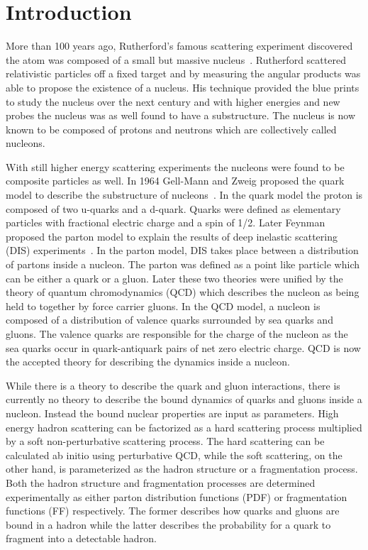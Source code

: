 \chapter{Introduction} \label{ch::intro}

More than 100 years ago, Rutherford's famous scattering experiment discovered
the atom was composed of a small but massive nucleus~\cite{Rutherford:1911zz}.
Rutherford scattered relativistic particles off a fixed target and by measuring
the angular products was able to propose the existence of a nucleus.  His
technique provided the blue prints to study the nucleus over the next century
and with higher energies and new probes the nucleus was as well found to have a
substructure.  The nucleus is now known to be composed of protons
and neutrons which are collectively called nucleons.

With still higher energy scattering experiments the nucleons were found to be
composite particles as well.  In 1964 Gell-Mann and Zweig proposed the quark
model to describe the substructure of
nucleons~\cite{GellMann:1964nj,Zweig:1964jf}.  In the quark model the proton is
composed of two u-quarks and a d-quark.  Quarks were defined as elementary
particles with fractional electric charge and a spin of 1/2.  Later Feynman
proposed the parton model to explain the results of deep inelastic scattering
(DIS) experiments~\cite{PhysRevLett.23.1415}.  In the parton model, DIS takes
place between a distribution of partons inside a nucleon.  The parton was
defined as a point like particle which can be either a quark or a gluon.  Later
these two theories were unified by the theory of quantum chromodynamics (QCD)
which describes the nucleon as being held to together by force carrier gluons.
In the QCD model, a nucleon is composed of a distribution of valence quarks
surrounded by sea quarks and gluons.  The valence quarks are responsible for the
charge of the nucleon as the sea quarks occur in quark-antiquark pairs of net
zero electric charge.  QCD is now the accepted theory for describing the
dynamics inside a nucleon.

While there is a theory to describe the quark and gluon interactions, there is
currently no theory to describe the bound dynamics of quarks and gluons inside a
nucleon.  Instead the bound nuclear properties are input as parameters.  High
energy hadron scattering can be factorized as a hard scattering process
multiplied by a soft non-perturbative scattering process.  The hard scattering
can be calculated ab initio using perturbative QCD, while the soft scattering,
on the other hand, is parameterized as the hadron structure or a fragmentation
process.  Both the hadron structure and fragmentation processes are determined
experimentally as either parton distribution functions (PDF) or fragmentation
functions (FF) respectively.  The former describes how quarks and gluons are
bound in a hadron while the latter describes the probability for a quark to
fragment into a detectable hadron.

